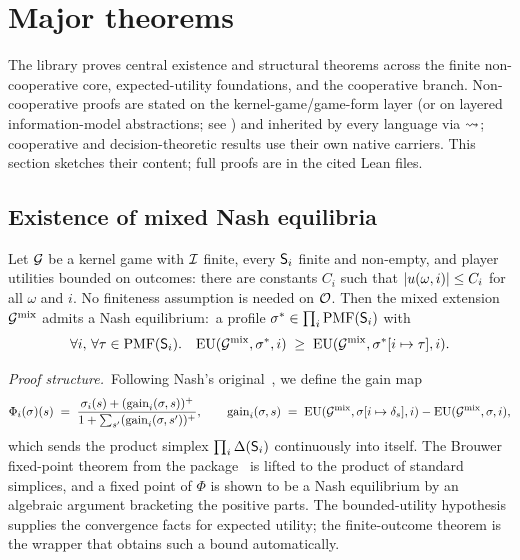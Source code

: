 \section{Major theorems}
\label{sec:theorems}

The library proves central existence and structural theorems across
the finite non-cooperative core, expected-utility foundations, and the
cooperative branch.  Non-cooperative proofs are stated on the
kernel-game/game-form layer (or on layered information-model
abstractions; see ) and inherited by every
language via $\rightsquigarrow$; cooperative and decision-theoretic results
use their own native carriers.  This section sketches their content;
full proofs are in the cited Lean files.

\subsection{Existence of mixed Nash equilibria}
\label{sec:theorems:nash-mixed}

\begin{theorem}
\label{thm:nash-mixed}
Let $\mathcal{G}$ be a kernel game with $\mathcal{I}$ finite, every $\mathsf{S}_i$
finite and non-empty, and player utilities bounded on outcomes:
there are constants $C_i$ such that
$|u(\omega,i)| \le C_i$ for all $\omega$ and $i$.  No finiteness
assumption is needed on $\mathcal{O}$.  Then the mixed extension
$\mathcal{G}^{\mathrm{mix}}$ admits a Nash equilibrium:\ a
profile $\sigma^* \in \prod_i \mathrm{PMF}(\mathsf{S}_i)$ with
\[
  \forall i,\,\forall \tau \in \mathrm{PMF}(\mathsf{S}_i).\quad
    \mathrm{EU}(\mathcal{G}^{\mathrm{mix}}, \sigma^*, i)
      \;\ge\;
    \mathrm{EU}(\mathcal{G}^{\mathrm{mix}}, \sigma^*[i \mapsto \tau], i).
\]
\end{theorem}

\noindent\emph{Proof structure.}\ Following Nash's
original~\citep{Nash1950, Nash1951}, we define the gain map
\[
  \Phi_i(\sigma)(s)
    \;=\; \frac{\sigma_i(s) + (\mathrm{gain}_i(\sigma, s))^+}
              {1 + \sum_{s'} (\mathrm{gain}_i(\sigma, s'))^+},
  \qquad
  \mathrm{gain}_i(\sigma, s)
    \;=\;
    \mathrm{EU}(\mathcal{G}^{\mathrm{mix}}, \sigma[i \mapsto \delta_s], i)
      - \mathrm{EU}(\mathcal{G}^{\mathrm{mix}}, \sigma, i),
\]
which sends the product simplex $\prod_i \Delta(\mathsf{S}_i)$
continuously into itself.  The Brouwer fixed-point theorem from
the 
package~\citep{harfeFixedPointTheorems} is lifted to the product
of standard simplices, and a fixed point of $\Phi$ is shown to be
a Nash equilibrium by an algebraic argument bracketing the positive
parts.  The bounded-utility hypothesis supplies the convergence
facts for expected utility; the finite-outcome theorem
 is the wrapper that obtains
such a bound automatically.

